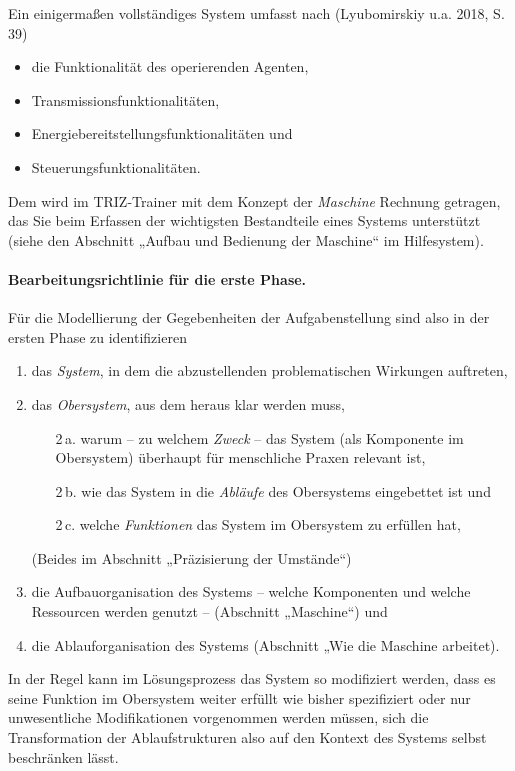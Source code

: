 \documentclass[11pt,a4paper]{article}
\begin{document}
Ein einigermaßen vollständiges System umfasst nach (Lyubomirskiy u.a. 2018,
S. 39)
\enlargethispage{1em}
\begin{itemize}\itemsep0pt
\item die Funktionalität des operierenden Agenten,
\item Transmissionsfunktionalitäten,
\item Energiebereitstellungsfunktionalitäten und
\item Steuerungsfunktionalitäten.
\end{itemize}
Dem wird im TRIZ-Trainer mit dem Konzept der \emph{Maschine} Rechnung
getragen, das Sie beim Erfassen der wichtigsten Bestandteile eines Systems
unterstützt (siehe den Abschnitt „Aufbau und Bedienung der Maschine“ im
Hilfesystem).

\paragraph{Bearbeitungsrichtlinie für die erste Phase.}
Für die Modellierung der Gegebenheiten der Aufgabenstellung sind also in der
ersten Phase zu identifizieren 
\begin{enumerate}\itemsep0pt
\item das \emph{System}, in dem die abzustellenden problematischen Wirkungen
  auftreten,
\item das \emph{Obersystem}, aus dem heraus klar werden muss,
\begin{enumerate}\itemsep0pt
\item [2\,a.] warum -- zu welchem \emph{Zweck} -- das System (als Komponente
  im Obersystem) überhaupt für menschliche Praxen relevant ist,
\item [2\,b.] wie das System in die \emph{Abläufe} des Obersystems eingebettet
  ist und
\item [2\,c.] welche \emph{Funktionen} das System im Obersystem zu erfüllen
  hat,
\end{enumerate}
(Beides im Abschnitt „Präzisierung der Umstände“)
\item die Aufbauorganisation des Systems -- welche Komponenten und welche
  Ressourcen werden genutzt -- (Abschnitt „Maschine“) und
\item die Ablauforganisation des Systems (Abschnitt „Wie die Maschine
  arbeitet).
\end{enumerate}
In der Regel kann im Lösungsprozess das System so modifiziert werden, dass es
seine Funktion im Obersystem weiter erfüllt wie bisher spezifiziert oder nur
unwesentliche Modifikationen vorgenommen werden müssen, sich die
Transformation der Ablaufstrukturen also auf den Kontext des Systems selbst
beschränken lässt.
\end{document}
